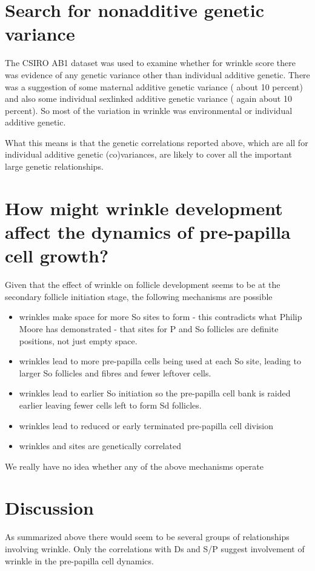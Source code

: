\documentclass[titlepage]{article}  %
\begin{document}
\section{Search for nonadditive genetic variance}
The CSIRO AB1 dataset was used to examine whether for wrinkle score there was evidence of any genetic variance other than individual additive genetic. There was a suggestion of some maternal additive genetic variance ( about 10 percent) and also some individual sexlinked additive genetic variance ( again about 10 percent). So most of the variation in wrinkle was environmental or individual additive genetic. 

What this means is that the genetic correlations reported above, which are all for individual additive genetic (co)variances, are likely to cover all the important large genetic relationships. 

\section{How might wrinkle development affect the dynamics of pre-papilla cell growth?}
Given that the effect of wrinkle on follicle development seems to be at the secondary follicle initiation stage, the following mechanisms are possible
\begin{itemize}
\item wrinkles make space for more So sites to form - this contradicts what Philip Moore has demonstrated - that sites for P and So follicles are definite positions, not just empty space.
\item wrinkles lead to more pre-papilla cells being used at each So site, leading to larger So follicles and fibres and fewer leftover cells.
\item wrinkles lead to earlier So initiation so the pre-papilla cell bank is raided earlier leaving fewer cells left to form Sd follicles.
\item wrinkles lead to reduced or early terminated pre-papilla cell division
\item wrinkles and sites are genetically correlated
\end{itemize}

We really have no idea whether any of the above mechanisms operate

\section{Discussion}
As summarized above there would seem to be several groups of relationships involving wrinkle. Only the correlations with Ds and S/P suggest involvement of wrinkle in the pre-papilla cell dynamics. 
\end{document}
